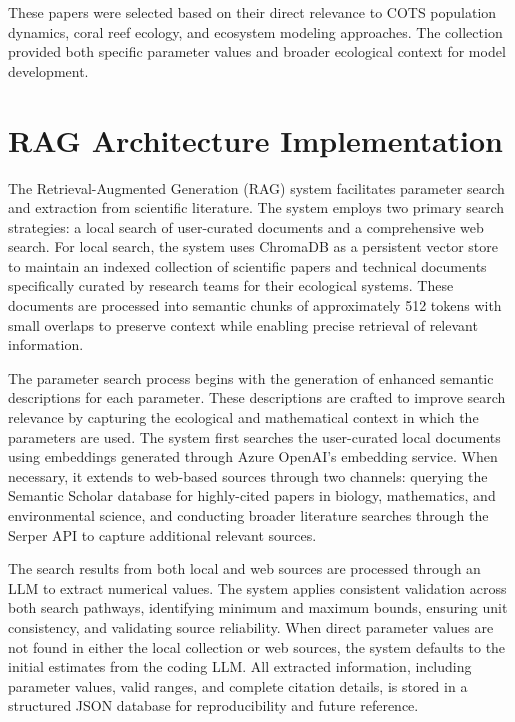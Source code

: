 These papers were selected based on their direct relevance to COTS population dynamics, coral reef ecology, and ecosystem modeling approaches. The collection provided both specific parameter values and broader ecological context for model development.

\section{RAG Architecture Implementation}
\label{subsec:rag_architecture}

The Retrieval-Augmented Generation (RAG) system facilitates parameter search and extraction from scientific literature. The system employs two primary search strategies: a local search of user-curated documents and a comprehensive web search. For local search, the system uses ChromaDB as a persistent vector store to maintain an indexed collection of scientific papers and technical documents specifically curated by research teams for their ecological systems. These documents are processed into semantic chunks of approximately 512 tokens with small overlaps to preserve context while enabling precise retrieval of relevant information.

The parameter search process begins with the generation of enhanced semantic descriptions for each parameter. These descriptions are crafted to improve search relevance by capturing the ecological and mathematical context in which the parameters are used. The system first searches the user-curated local documents using embeddings generated through Azure OpenAI's embedding service. When necessary, it extends to web-based sources through two channels: querying the Semantic Scholar database for highly-cited papers in biology, mathematics, and environmental science, and conducting broader literature searches through the Serper API to capture additional relevant sources.

The search results from both local and web sources are processed through an LLM to extract numerical values. The system applies consistent validation across both search pathways, identifying minimum and maximum bounds, ensuring unit consistency, and validating source reliability. When direct parameter values are not found in either the local collection or web sources, the system defaults to the initial estimates from the coding LLM. All extracted information, including parameter values, valid ranges, and complete citation details, is stored in a structured JSON database for reproducibility and future reference.

